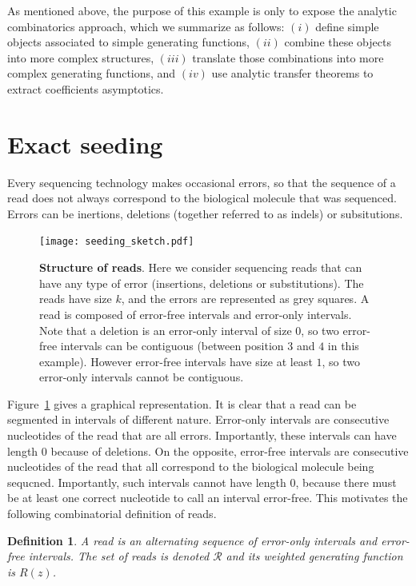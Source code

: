 \documentclass{article}
\newtheorem{definition}{Definition}
\begin{document}
As mentioned above, the purpose of this example is only to expose the
analytic combinatorics approach, which we summarize as follows: $(i)$
define simple objects associated to simple generating functions, $(ii)$
combine these objects into more complex structures, $(iii)$ translate
those combinations into more complex generating functions, and $(iv)$ use
analytic transfer theorems to extract coefficients asymptotics.



\section{Exact seeding}

Every sequencing technology makes occasional errors, so that the sequence
of a read does not always correspond to the biological molecule that was
sequenced. Errors can be inertions, deletions (together referred to as
indels) or subsitutions.

\begin{figure}[h]
\centering
\texttt{[image: seeding\_sketch.pdf]}
\caption{\textbf{Structure of reads}. Here we consider sequencing reads
that can have any type of error (insertions, deletions or substitutions).
The reads have size $k$, and the errors are represented as grey squares. A
read is composed of error-free intervals and error-only intervals. Note
that a deletion is an error-only interval of size $0$, so two error-free
intervals can be contiguous (between position $3$ and $4$ in this
example). However error-free intervals have size at least $1$, so two
error-only intervals cannot be contiguous.}
\label{fig:sketchseed}
\end{figure}

Figure~\ref{fig:sketchseed} gives a graphical representation.  It is clear
that a read can be segmented in intervals of different nature.  Error-only
intervals are consecutive nucleotides of the read that are all errors.
Importantly, these intervals can have length $0$ because of deletions. On
the opposite, error-free intervals are consecutive nucleotides of the read
that all correspond to the biological molecule being sequcned.
Importantly, such intervals cannot have length $0$, because there must be
at least one correct nucleotide to call an interval error-free. This
motivates the following combinatorial definition of reads.

\begin{definition}
\label{def:read}
A read is an alternating sequence of error-only intervals and error-free
intervals. The set of reads is denoted $\mathcal{R}$ and its weighted
generating function is $R(z)$.
\end{definition}
\end{document}
